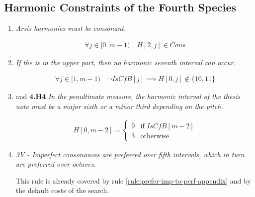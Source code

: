 \subsection*{Harmonic Constraints of the Fourth Species}
\begin{enumerate}[wide, label=\bfseries 4.H\arabic*]
  \item\label{rule:arsiscons} {\textit{Arsis harmonies must be consonant.}}

\begin{equation}
    \begin{gathered}
        \forall j \in [0, m-1) \quad
        H[2, j] \in Cons
    \end{gathered}
    \label{eq:arsiscons}
\end{equation}

\item\label{rule:noseventh} {\textit{If the \cfs is in the upper part, then no harmonic seventh interval can occur.}}

\begin{equation}
    \begin{gathered}
        \forall j \in [1, m-1) \quad
        \lnot IsCfB[j] \implies H[0, j] \notin \{10, 11\}
    \end{gathered}
\end{equation}

\item\label{rule:lowpenult4th} \label{rule:uppenult4th} {and \textbf{4.H4} \textit{In the penultimate measure, the harmonic interval of the thesis note must be a major sixth or a minor third depending on the \cfs pitch.}}

\begin{equation}
    \begin{gathered}
        H[0, m-2] = \begin{cases}
            9 & \text{if } IsCfB[m-2]\\
            3 & \text{otherwise}
        \end{cases}
    \end{gathered}
\end{equation}

\item \textit{3V - Imperfect consonances are preferred over fifth intervals, which in turn are preferred over octaves.}   

    This rule is already covered by rule \ref{rule:prefer-imp-to-perf-appendix} and by the default costs of the search.
\end{enumerate}
